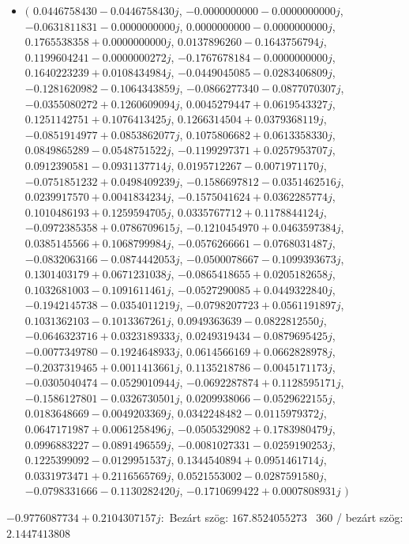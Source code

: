 \documentclass[14pt,a4paper]{article}
\begin{document}
\begin{itemize}
\item
$\big($
$0.0446758430-0.0446758430j$, $-0.0000000000-0.0000000000j$, $-0.0631811831-0.0000000000j$, $0.0000000000-0.0000000000j$, $0.1765538358+0.0000000000j$, $0.0137896260-0.1643756794j$, $0.1199604241-0.0000000272j$, $-0.1767678184-0.0000000000j$, $0.1640223239+0.0108434984j$, $-0.0449045085-0.0283406809j$, $-0.1281620982-0.1064343859j$, $-0.0866277340-0.0877070307j$, $-0.0355080272+0.1260609094j$, $0.0045279447+0.0619543327j$, $0.1251142751+0.1076413425j$, $0.1266314504+0.0379368119j$, $-0.0851914977+0.0853862077j$, $0.1075806682+0.0613358330j$, $0.0849865289-0.0548751522j$, $-0.1199297371+0.0257953707j$, $0.0912390581-0.0931137714j$, $0.0195712267-0.0071971170j$, $-0.0751851232+0.0498409239j$, $-0.1586697812-0.0351462516j$, $0.0239917570+0.0041834234j$, $-0.1575041624+0.0362285774j$, $0.1010486193+0.1259594705j$, $0.0335767712+0.1178844124j$, $-0.0972385358+0.0786709615j$, $-0.1210454970+0.0463597384j$, $0.0385145566+0.1068799984j$, $-0.0576266661-0.0768031487j$, $-0.0832063166-0.0874442053j$, $-0.0500078667-0.1099393673j$, $0.1301403179+0.0671231038j$, $-0.0865418655+0.0205182658j$, $0.1032681003-0.1091611461j$, $-0.0527290085+0.0449322840j$, $-0.1942145738-0.0354011219j$, $-0.0798207723+0.0561191897j$, $0.1031362103-0.1013367261j$, $0.0949363639-0.0822812550j$, $-0.0646323716+0.0323189333j$, $0.0249319434-0.0879695425j$, $-0.0077349780-0.1924648933j$, $0.0614566169+0.0662828978j$, $-0.2037319465+0.0011413661j$, $0.1135218786-0.0045171173j$, $-0.0305040474-0.0529010944j$, $-0.0692287874+0.1128595171j$, $-0.1586127801-0.0326730501j$, $0.0209938066-0.0529622155j$, $0.0183648669-0.0049203369j$, $0.0342248482-0.0115979372j$, $0.0647171987+0.0061258496j$, $-0.0505329082+0.1783980479j$, $0.0996883227-0.0891496559j$, $-0.0081027331-0.0259190253j$, $0.1225399092-0.0129951537j$, $0.1344540894+0.0951461714j$, $0.0331973471+0.2116565769j$, $0.0521553002-0.0287591580j$, $-0.0798331666-0.1130282420j$, $-0.1710699422+0.0007808931j$
$\big)$
\end{itemize}
$-0.9776087734+0.2104307157j$:\
Bezárt szög: $167.8524055273$ \
360 / bezárt szög: $2.1447413808$\
\end{document}
